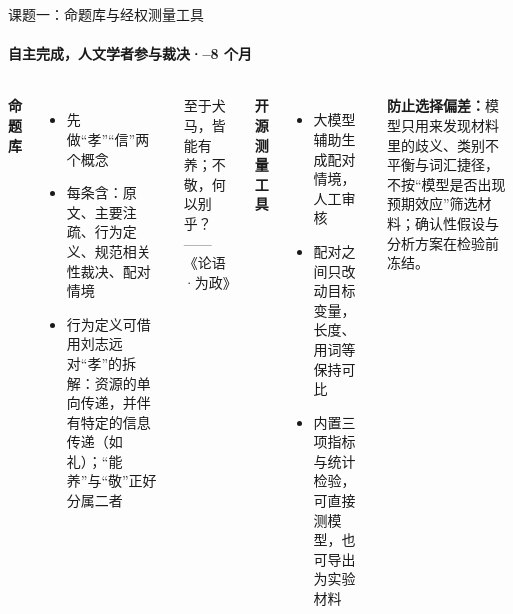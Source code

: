 \documentclass[aspectratio=169,11pt,fontset=fandol]{ctexbeamer}
\newcommand{\hg}[1]{{\bfseries\color{golddeep}#1}}       %
\newcommand{\src}[1]{{\footnotesize\color{graytext}——#1}}
\begin{document}
\begin{frame}[t]{课题一：命题库与经权测量工具}
\framesubtitle{自主完成，人文学者参与裁决\quad·–8 个月}
\vspace{2pt}
\begin{columns}[T,onlytextwidth]
{\hg{命题库}}
\begin{itemize}\small\setlength{\itemsep}{2pt}
\item 先做“孝”“信”两个概念
\item 每条含：原文、主要注疏、行为定义、规范相关性裁决、配对情境
\item 行为定义可借用刘志远对“孝”的拆解：资源的单向传递，并伴有特定的信息传递（如礼）；“能养”与“敬”正好分属二者
\end{itemize}
\vspace{2pt}
\begin{classic}\small
至于犬马，皆能有养；不敬，何以别乎？\hfill\src{《论语·为政》}
\end{classic}
{\hg{开源测量工具}}
\begin{itemize}\small\setlength{\itemsep}{2pt}
\item 大模型辅助生成配对情境，人工审核
\item 配对之间只改动目标变量，长度、用词等保持可比
\item 内置三项指标与统计检验，可直接测模型，也可导出为实验材料
\end{itemize}
\vspace{2pt}
\begin{caution}
\small\textbf{防止选择偏差：}模型只用来发现材料里的歧义、类别不平衡与词汇捷径，不按“模型是否出现预期效应”筛选材料；确认性假设与分析方案在检验前冻结。
\end{caution}
\end{columns}
\end{frame}
\end{document}
